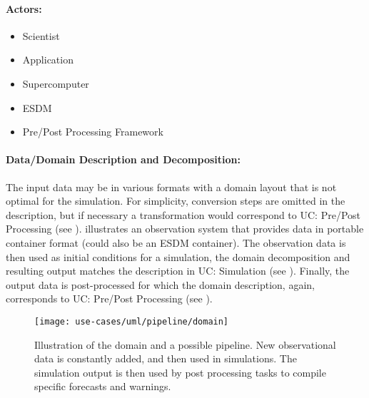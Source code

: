 \paragraph{Actors:}
\begin{itemize}
	\item Scientist
	\item Application
	\item Supercomputer
	\item ESDM
	\item Pre/Post Processing Framework
\end{itemize}


\paragraph{Data/Domain Description and Decomposition:}
The input data may be in various formats with a domain layout that is not optimal for the simulation.
For simplicity, conversion steps are omitted in the description, but if necessary a transformation would correspond to UC: Pre/Post Processing (see ).
 illustrates an observation system that provides data in portable container format (could also be an ESDM container).
The observation data is then used as initial conditions for a simulation, the domain decomposition and resulting output matches the description in UC: Simulation (see ).
Finally, the output data is post-processed for which the domain description, again, corresponds to UC: Pre/Post Processing (see ).


\begin{figure}
	\centering
	\texttt{[image: use-cases/uml/pipeline/domain]}
	\caption{Illustration of the domain and a possible pipeline. New observational data is constantly added, and then used in simulations. The simulation output is then used by post processing tasks to compile specific forecasts and warnings.}
	\label{fig:domain workflow}
\end{figure}




